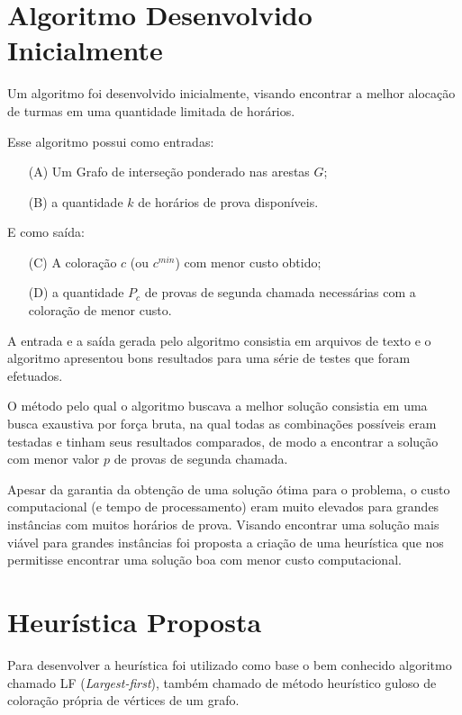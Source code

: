 \section{Algoritmo Desenvolvido Inicialmente}
\label{sec-alg-desv}

Um algoritmo foi desenvolvido inicialmente, visando encontrar a melhor alocação de turmas em uma quantidade limitada de horários.

Esse algoritmo possui como entradas: 
\begin{itemize}
    \item[(A)] Um Grafo de interseção ponderado nas arestas $G$;
    \item[(B)] a quantidade $k$ de horários de prova disponíveis.
\end{itemize}
 

E como saída:
\begin{itemize}
    \item[(C)] A coloração $c$  (ou $c^{min}$) com menor custo obtido;
    \item[(D)] a quantidade $P_c$ de provas de segunda chamada necessárias com a coloração de menor custo. 
\end{itemize}
 

A entrada e a saída gerada pelo algoritmo consistia em arquivos de texto e o algoritmo apresentou bons resultados para uma série de testes que foram efetuados.

O método pelo qual o algoritmo buscava a melhor solução consistia em uma busca exaustiva por força bruta, na qual todas as combinações possíveis eram testadas e tinham seus resultados comparados, de modo a encontrar a solução com menor valor $p$ de provas de segunda chamada.

Apesar da garantia da obtenção de uma solução ótima para o problema, o custo computacional (e tempo de processamento) eram muito elevados para grandes instâncias com muitos horários de prova. Visando encontrar uma solução mais viável para grandes instâncias foi proposta a criação de uma heurística que nos permitisse encontrar uma solução boa com menor custo computacional.

\section{Heurística Proposta}


Para desenvolver a heurística foi utilizado como base o bem conhecido algoritmo chamado LF (\emph{Largest-first}), também chamado de método heurístico guloso de coloração própria de vértices de um grafo.

